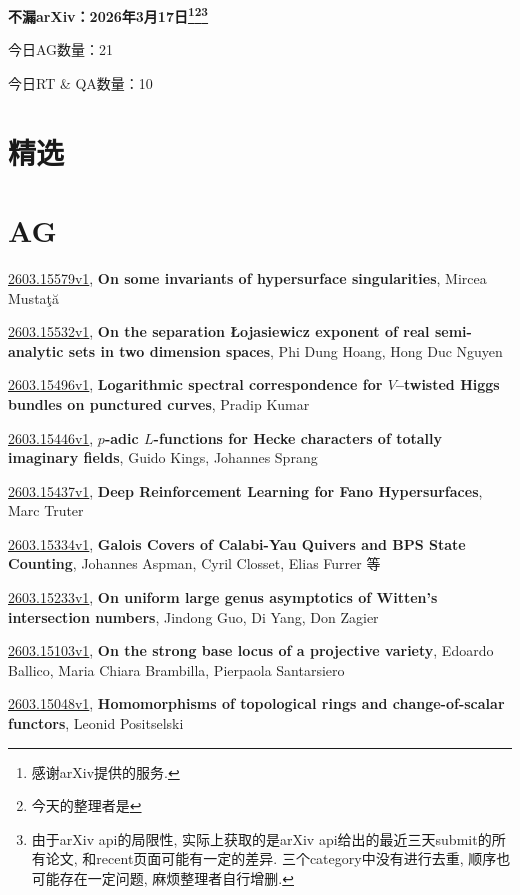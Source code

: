 \documentclass[9pt, a4paper]{article}
\theoremstyle{plain}
\theoremstyle{definition}
\theoremstyle{remark}
\newcommand{\arxiv}[3]{\href{https://arxiv.org/abs/#1}{#1}, \textbf{\textcolor{arxivblue}{#2}}, #3}
\newcommand{\AGnumber}{21}
\newcommand{\RTQAnumber}{10}
\newcommand{\NewestDate}{2026年3月17日}
\newcommand{\todayarXiver}{} %
\begin{document}
\begin{center}
    \Huge\textbf{不漏arXiv：\NewestDate\footnote{感谢arXiv提供的服务.}\footnote{今天的整理者是\todayarXiver}\footnote{由于arXiv api的局限性, 实际上获取的是arXiv api给出的最近三天submit的所有论文, 和recent页面可能有一定的差异. 三个category中没有进行去重, 顺序也可能存在一定问题, 麻烦整理者自行增删.}} \\
\end{center}

\setcounter{section}{-1}

\begin{center}
    今日AG数量：\AGnumber
    
    今日RT \& QA数量：\RTQAnumber
    
\end{center}


\section{精选}


\section{AG}
\arxiv{2603.15579v1}{On some invariants of hypersurface singularities}{Mircea Mustaţă}

\arxiv{2603.15532v1}{On the separation Łojasiewicz exponent of real semi-analytic sets in two dimension spaces}{Phi Dung Hoang, Hong Duc Nguyen}

\arxiv{2603.15496v1}{Logarithmic spectral correspondence for $V$--twisted Higgs bundles on punctured curves}{Pradip Kumar}

\arxiv{2603.15446v1}{$p$-adic $L$-functions for Hecke characters of totally imaginary fields}{Guido Kings, Johannes Sprang}

\arxiv{2603.15437v1}{Deep Reinforcement Learning for Fano Hypersurfaces}{Marc Truter}

\arxiv{2603.15334v1}{Galois Covers of Calabi-Yau Quivers and BPS State Counting}{Johannes Aspman, Cyril Closset, Elias Furrer 等}

\arxiv{2603.15233v1}{On uniform large genus asymptotics of Witten's intersection numbers}{Jindong Guo, Di Yang, Don Zagier}

\arxiv{2603.15103v1}{On the strong base locus of a projective variety}{Edoardo Ballico, Maria Chiara Brambilla, Pierpaola Santarsiero}

\arxiv{2603.15048v1}{Homomorphisms of topological rings and change-of-scalar functors}{Leonid Positselski}
\end{document}
